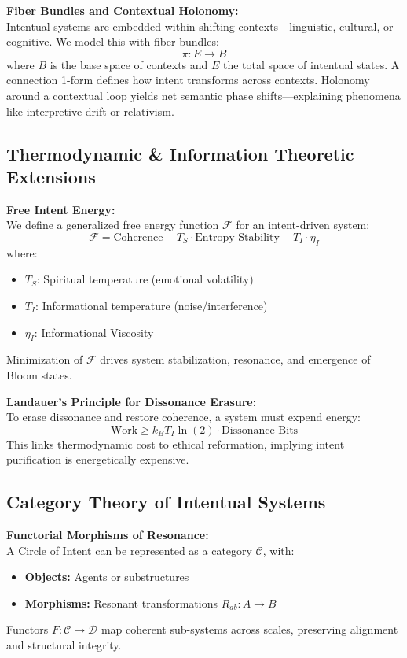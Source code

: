 \documentclass[12pt]{article}
\begin{document}
\textbf{Fiber Bundles and Contextual Holonomy:} \\
Intentual systems are embedded within shifting contexts—linguistic, cultural, or cognitive. We model this with fiber bundles:
\[
\pi: E \rightarrow B
\]
where \(B\) is the base space of contexts and \(E\) the total space of intentual states. A connection 1-form defines how intent transforms across contexts. Holonomy around a contextual loop yields net semantic phase shifts—explaining phenomena like interpretive drift or relativism.

\subsection{Thermodynamic \& Information Theoretic Extensions}

\textbf{Free Intent Energy:} \\
We define a generalized free energy function \(\mathcal{F}\) for an intent-driven system:
\[
\mathcal{F} = \text{Coherence} - T_S \cdot \text{Entropy Stability} - T_I \cdot \eta_I
\]
where:
\begin{itemize}
  \item \(T_S\): Spiritual temperature (emotional volatility)
  \item \(T_I\): Informational temperature (noise/interference)
  \item \(\eta_I\): Informational Viscosity
\end{itemize}
Minimization of \(\mathcal{F}\) drives system stabilization, resonance, and emergence of Bloom states.

\textbf{Landauer’s Principle for Dissonance Erasure:} \\
To erase dissonance and restore coherence, a system must expend energy:
\[
\text{Work} \geq k_B T_I \ln(2) \cdot \text{Dissonance Bits}
\]
This links thermodynamic cost to ethical reformation, implying intent purification is energetically expensive.

\subsection{Category Theory of Intentual Systems}

\textbf{Functorial Morphisms of Resonance:} \\
A Circle of Intent can be represented as a category \(\mathcal{C}\), with:
\begin{itemize}
  \item \textbf{Objects:} Agents or substructures
  \item \textbf{Morphisms:} Resonant transformations \(R_{ab}: A \rightarrow B\)
\end{itemize}
Functors \(F: \mathcal{C} \rightarrow \mathcal{D}\) map coherent sub-systems across scales, preserving alignment and structural integrity.
\end{document}

